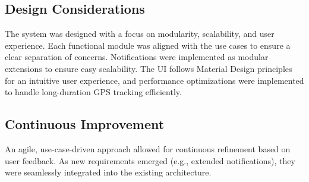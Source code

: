 \subsection{Design Considerations}
The system was designed with a focus on modularity, scalability, and user experience. Each functional module was aligned with the use cases to ensure a clear separation of concerns. Notifications were implemented as modular extensions to ensure easy scalability. The UI follows Material Design principles for an intuitive user experience, and performance optimizations were implemented to handle long-duration GPS tracking efficiently.

\subsection{Continuous Improvement}
An agile, use-case-driven approach allowed for continuous refinement based on user feedback. As new requirements emerged (e.g., extended notifications), they were seamlessly integrated into the existing architecture.

